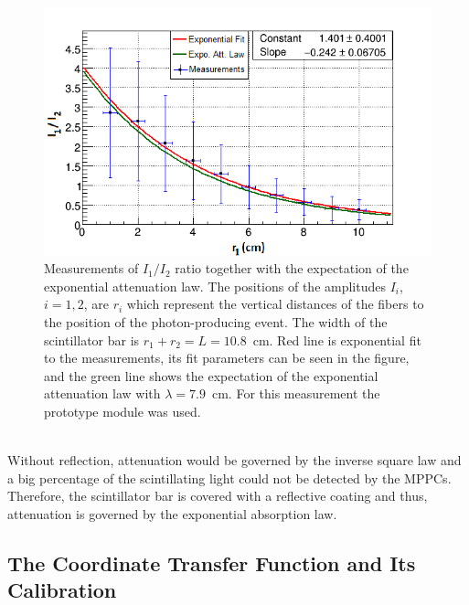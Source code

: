 \documentclass[a4paper]{article}\linespread{1.4}
\begin{document}
\begin{figure}[h!] \hspace*{0cm} \includegraphics[width=130mm,scale=2.0]{figures/effofre.png} \caption{Measurements of $I_{1} / I_{2}$ ratio together with the expectation of the exponential attenuation law.  
The positions of the amplitudes $I_{i}$, $i=1,2$, are  $r_{i}$ which represent the vertical distances of the fibers to the position of the photon-producing event. The width of the scintillator bar is $ r_{1} + r_{2}=L=10.8$~cm. Red line is exponential fit to the measurements, its fit parameters can be seen in the figure, and the green line shows the expectation of the exponential attenuation law with $\lambda=7.9$~cm.
For this measurement the prototype module was used. } \label{fig:gull1} \end{figure}
\\Without reflection, attenuation would be governed by the inverse square law and a big percentage of the scintillating light could not be detected by the MPPCs. Therefore, the scintillator bar is covered with a reflective coating and thus, attenuation is governed by the exponential absorption law. 


\subsection{The Coordinate Transfer Function and Its Calibration}
\label{chap:mu}
\end{document}
